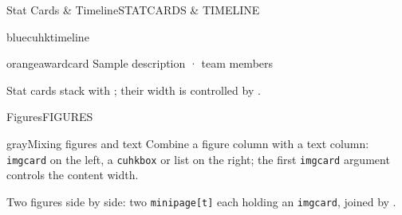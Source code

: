 \documentclass[10pt,aspectratio=169]{beamer}
\begin{document}
\begin{frame}{Stat Cards \& Timeline}{STATCARDS \& TIMELINE}
  \cuhkstatwidth=4.55cm
  \begin{center}
    \hfill
    \hfill
  \end{center}
  \vspace{0.4mm}
  \begin{minipage}[t]{0.475\textwidth}
    \vspace{0pt}%
    \begin{cuhkbox}{blue}{cuhktimeline}
      \begin{cuhktimeline}
      \end{cuhktimeline}
    \end{cuhkbox}
  \end{minipage}\hfill
  \begin{minipage}[t]{0.475\textwidth}
    \vspace{0pt}%
    \begin{cuhkbox}{orange}{awardcard}
      \cuhkawardwidth=6.1cm
      {Sample description · team members}
    \end{cuhkbox}
  \end{minipage}
  \begin{takeaway}
    Stat cards stack with \string\hfill; their width is controlled by \string\cuhkstatwidth.
  \end{takeaway}
\end{frame}

\begin{frame}{Figures}{FIGURES}
  \begin{minipage}[t]{0.475\textwidth}
    \vspace{0pt}%
    \centering
  \end{minipage}\hfill
  \begin{minipage}[t]{0.475\textwidth}
    \vspace{0pt}%
    \centering
  \end{minipage}
  \begin{cuhkbox}{gray}{Mixing figures and text}
    {\small Combine a figure column with a text column:
    \texttt{imgcard} on the left, a \texttt{cuhkbox} or list on the right;
    the first \texttt{imgcard} argument controls the content width.}
  \end{cuhkbox}
  \begin{takeaway}
    Two figures side by side: two \texttt{minipage[t]} each holding an \texttt{imgcard}, joined by \string\hfill.
  \end{takeaway}
\end{frame}
\end{document}
